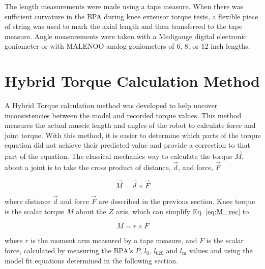 
The length measurements were made using a tape measure. When there was sufficient curvature in the BPA during knee extensor torque tests, a flexible piece of string was used to mark the axial length and then transferred to the tape measure. Angle measurements were taken with a Medigauge digital electronic goniometer or with MALENOO analog goniometers of 6, 8, or 12 inch lengths.  


\section{Hybrid Torque Calculation Method}\label{sec:hybrid_method}


A Hybrid Torque calculation method was developed to help uncover inconsistencies between the model and recorded torque values. This method measures the actual muscle length and angles of the robot to calculate force and joint torque. With this method, it is easier to determine which parts of the torque equation did not achieve their predicted value and provide a correction to that part of the equation. The classical mechanics way to calculate the torque $\Vec{M}$, about a joint is to take the cross product of distance, $\Vec{d}$, and force, $\Vec{F}$

\begin{equation}
    \Vec{M} = \Vec{d} \times \Vec{F} \label{eq:M_vec}
\end{equation}

where distance $\Vec{d}$ and force $\Vec{F}$ are described in the previous section. Knee torque is the scalar torque $M$ about the $Z$ axis, which can simplify Eq. \ref{eq:M_vec} to

\begin{equation}
    M = r \times F \label{eq:M_scalar}
\end{equation}

where $r$ is the moment arm measured by a tape measure, and $F$ is the scalar force, calculated by measuring the BPA's $P$, $l_{0}$, $l_{620}$ and $l_\text{m}$ values and using the model fit equations determined in the following section.



